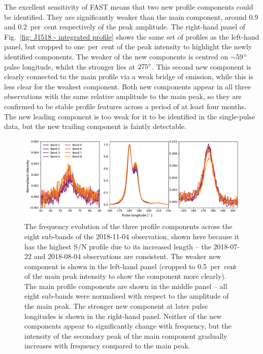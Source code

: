 The excellent sensitivity of FAST means that two new profile components could be identified. They are significantly weaker than the main component, around 0.9 and 0.2~per~cent respectively of the peak amplitude. The right-hand panel of Fig.~\ref{fig: J1518 - integrated profile} shows the same set of profiles as the left-hand panel, but cropped to one~per~cent of the peak intensity to highlight the newly identified components. The weaker of the new components is centred on $\sim$59$^\circ$ pulse longitude, whilst the stronger lies at $275^\circ$. This second new component is clearly connected to the main profile via a weak bridge of emission, while this is less clear for the weakest component. Both new components appear in all three observations with the same relative amplitude to the main peak, so they are confirmed to be stable profile features across a period of at least four months. The new leading component is too weak for it to be identified in the single-pulse data, but the new trailing component is faintly detectable.

\begin{figure}
    \begin{center}
        \includegraphics[width=1.0\textwidth]{Figures/J1518/profile_freq_evolution}
        \caption[Frequency evolution of profile components]{The frequency evolution of the three profile components across the eight sub-bands of the 2018-11-04 observation, shown here because it has the highest S/N profile due to its increased length -- the 2018-07-22 and 2018-08-04 observations are consistent. The weaker new component is shown in the left-hand panel (cropped to 0.5~per~cent of the main peak intensity to show the component more clearly). The main profile components are shown in the middle panel -- all eight sub-bands were normalised with respect to the amplitude of the main peak. The stronger new component at later pulse longitudes is shown in the right-hand panel. Neither of the new components appear to significantly change with frequency, but the intensity of the secondary peak of the main component gradually increases with frequency compared to the main peak.}
        \label{fig: J1518 - profile frequency evolution}
    \end{center}
\end{figure}

